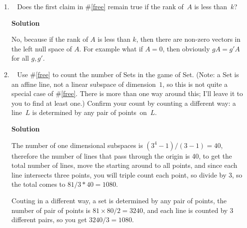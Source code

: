 \documentclass[11pt]{article}
\newcommand\score[1]{\marginpar{\vspace{-2ex}\color{blue}{#1/3}}\hspace{-1ex}}
\newcommand\0{\mathbf{0}}
\newcommand\<{\langle}
\renewcommand\>{\rangle}
\begin{document}
\begin{enumerate}
So the cardinality is $\frac{ \prod_{i=0}^{k-1}(q^n-q^i) }{ \prod_{i=0}^{k-1}(q^k-q^i) }$.

\pagebreak

\item\ \score{}%
Does the first claim in \#\ref{free} remain true if the rank of~$A$ is
less than~$k$?

\textbf{Solution}

No, because if the rank of $A$ is less than $k$, then there are non-zero vectors in the left null space of $A$.
For example what if $A=0$, then obviously $gA=g'A$ for all $g,g'$.
\pagebreak


\item\ \score{}%
Use \#\ref{free} to count the number of Sets in the game of Set.
(Note: a Set is an affine line, not a linear subspace of
dimension~$1$, so this is not quite a special case of \#\ref{free}.
There is more than one way around this; I'll leave it to you to find
at least one.)  Confirm your count by counting a different way: a
line~$L$ is determined by any pair of points~on~$L$.

\textbf{Solution}

The number of one dimensional subspaces is $(3^4-1)/(3-1)=40$, therefore the number of lines 
that pass through the origin is 40, to get the total number of lines, move the starting around to all
points, and since each line intersects three points, you will triple count each point, so divide by 3,
so the total comes to $81 / 3 * 40 = 1080$.

Couting in a different way, a set is determined by any pair of points, the number of pair of points
is $81 \times 80 /2 = 3240$, and each line is counted by 3 different pairs, so you get $3240/3 = 1080 $.

\end{enumerate}


\end{document}
